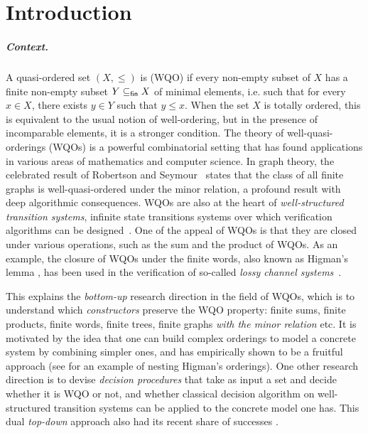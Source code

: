 \section{Introduction}
\label{sec:introduction}

\subparagraph{Context.} 
\AP
A quasi-ordered set $(X, \leq)$ is  (WQO)
if every non-empty subset of $X$ has a finite non-empty subset $Y \subseteq_{\mathsf{fin}} X$ of
minimal elements, i.e. such that for every $x \in X$, there exists
$y \in Y$ such that $y \leq x$. When the set $X$ is totally ordered,
this is equivalent to the usual notion of well-ordering, but in the presence of 
incomparable elements, it is a stronger condition.
The theory of well-quasi-orderings (WQOs) is a powerful
combinatorial setting that has found applications in various areas of
mathematics and computer science. In graph theory, the celebrated result of
Robertson and Seymour~\cite{ROBSEY04} states that the class of all finite
graphs is well-quasi-ordered under the minor relation, a profound result with
deep algorithmic consequences. WQOs are also at the heart of
\emph{well-structured transition systems}, infinite state transitions systems
over which verification algorithms can be designed~\cite{ABDU96,ABDU98}. One of
the appeal of WQOs is that they are closed under various operations, such as
the sum and the product of WQOs. As an example, the closure of WQOs under the
finite words, also known as Higman's lemma \cite{HIG52}, has been used in the
verification of so-called \emph{lossy channel systems}~\cite{ABDU93}. 

This explains the \emph{bottom-up} research direction in the field of WQOs,
which is to understand which \emph{constructors} preserve the WQO property:
finite sums, finite products, finite words, finite trees, finite graphs
\emph{with the minor relation} etc. It is motivated by the idea that one can
build complex orderings to model a concrete system by combining simpler ones,
and has empirically shown to be a fruitful approach (see \cite{HSS13} for an
example of nesting Higman's orderings). One other research direction is to
devise \emph{decision procedures} that take as input a set and decide whether
it is WQO or not, and whether classical decision algorithm on well-structured
transition systems can be applied to the concrete model one has. This dual
\emph{top-down} approach also had its recent share of successes
\cite{FINGU19,LOPEZ24}.


